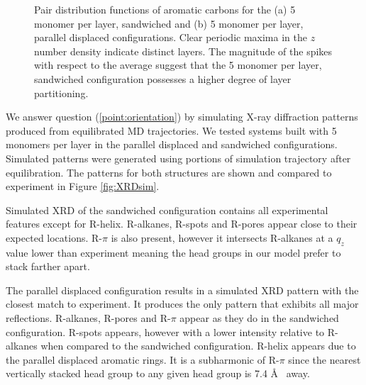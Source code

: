 \documentclass{article}
\begin{document}
\begin{figure}
\begin{subfigure}{0.45\textwidth}
                \caption{}\label{fig:zdf_offset}
        \end{subfigure}
        \caption{Pair distribution functions of aromatic carbons for the
        (a) 5 monomer per layer, sandwiched and (b) 5 monomer per layer,
        parallel displaced configurations. Clear periodic maxima in the
        $z$ number density indicate distinct layers. The magnitude
        of the spikes with respect to the average suggest that the 5
        monomer per layer, sandwiched configuration possesses a higher
        degree of layer partitioning.}\label{fig:zdf}
  \end{figure}

  We answer question (\ref{point:orientation}) by simulating X-ray diffraction
  patterns produced from equilibrated MD trajectories. We tested systems built
  with 5 monomers per layer in the parallel displaced and sandwiched
  configurations. Simulated patterns were generated using portions of simulation
  trajectory after equilibration. The patterns for both structures are shown and
  compared to experiment in Figure \ref{fig:XRDsim}.

  Simulated XRD of the sandwiched configuration contains all experimental
  features except for R-helix. R-alkanes, R-spots and R-pores appear close to their
  expected locations. R-$\pi$ is also present, however it intersects R-alkanes at
  a $q_z$ value lower than experiment meaning the head groups in our model prefer 
  to stack farther apart. 

  The parallel displaced configuration results in a simulated XRD pattern with
  the closest match to experiment. It produces the only pattern that exhibits
  all major reflections. R-alkanes, R-pores and R-$\pi$ appear as they do in the
  sandwiched configuration. R-spots appears, however with a lower intensity
  relative to R-alkanes when compared to the sandwiched configuration. R-helix
  appears due to the parallel displaced aromatic rings. It is a subharmonic
  of R-$\pi$ since the nearest vertically stacked head group to any given head
  group is 7.4 \AA~ away. 
\end{document}

